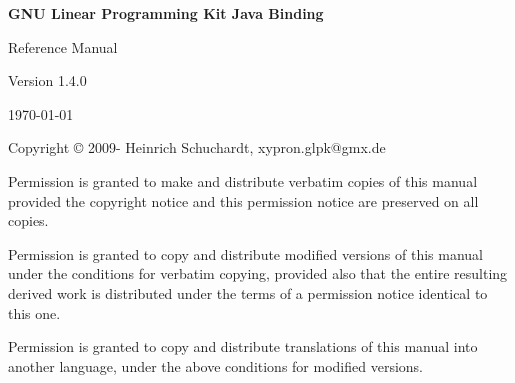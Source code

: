 \documentclass[a4paper,11pt]{report}
\newcommand{\glpkJavaVersion}{1.4.0}
\begin{document}

\thispagestyle{empty}

\begin{center}

\vspace*{1in}

\begin{huge}
\sf\bfseries GNU Linear Programming Kit\linebreak
Java Binding
\end{huge}

\vspace{0.5in}

\begin{LARGE}
\sf Reference Manual
\end{LARGE}

\vspace{0.5in}

\begin{LARGE}
\sf Version \glpkJavaVersion
\end{LARGE}

\vspace{0.5in}
\begin{Large}
\sf \today
\end{Large}
\end{center}

\newpage

\vspace*{1in}

\vfill

\medskip \noindent
Copyright \copyright{} 2009-{\the\year} Heinrich Schuchardt,
xypron.glpk@gmx.de

\medskip \noindent
Permission is granted to make and distribute verbatim copies of this
manual provided the copyright notice and this permission notice are
preserved on all copies.

\medskip \noindent
Permission is granted to copy and distribute modified versions of this
manual under the conditions for verbatim copying, provided also that the
entire resulting derived work is distributed under the terms of
a permission notice identical to this one.

\medskip \noindent
Permission is granted to copy and distribute translations of this manual
into another language, under the above conditions for modified versions.
\end{document}
